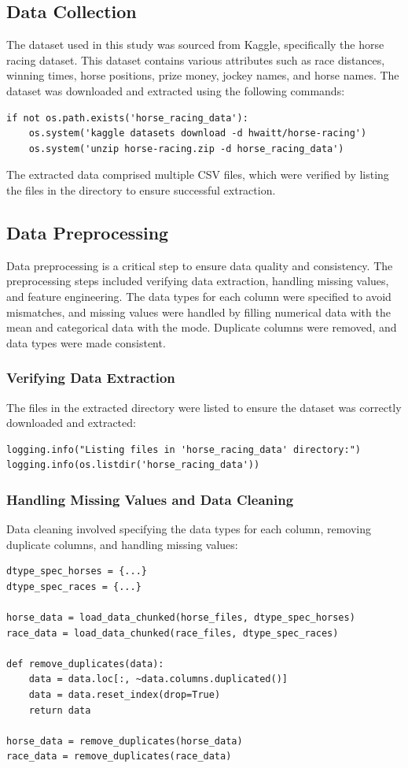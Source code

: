 \documentclass{article}
\begin{document}
\subsection*{Data Collection}
The dataset used in this study was sourced from Kaggle, specifically the horse racing dataset. This dataset contains various attributes such as race distances, winning times, horse positions, prize money, jockey names, and horse names. The dataset was downloaded and extracted using the following commands:
\begin{verbatim}
if not os.path.exists('horse_racing_data'):
    os.system('kaggle datasets download -d hwaitt/horse-racing')
    os.system('unzip horse-racing.zip -d horse_racing_data')
\end{verbatim}
The extracted data comprised multiple CSV files, which were verified by listing the files in the directory to ensure successful extraction.

\subsection*{Data Preprocessing}
Data preprocessing is a critical step to ensure data quality and consistency. The preprocessing steps included verifying data extraction, handling missing values, and feature engineering. The data types for each column were specified to avoid mismatches, and missing values were handled by filling numerical data with the mean and categorical data with the mode. Duplicate columns were removed, and data types were made consistent.

\subsubsection*{Verifying Data Extraction}
The files in the extracted directory were listed to ensure the dataset was correctly downloaded and extracted:
\begin{verbatim}
logging.info("Listing files in 'horse_racing_data' directory:")
logging.info(os.listdir('horse_racing_data'))
\end{verbatim}

\subsubsection*{Handling Missing Values and Data Cleaning}
Data cleaning involved specifying the data types for each column, removing duplicate columns, and handling missing values:
\begin{verbatim}
dtype_spec_horses = {...}
dtype_spec_races = {...}

horse_data = load_data_chunked(horse_files, dtype_spec_horses)
race_data = load_data_chunked(race_files, dtype_spec_races)

def remove_duplicates(data):
    data = data.loc[:, ~data.columns.duplicated()]
    data = data.reset_index(drop=True)
    return data

horse_data = remove_duplicates(horse_data)
race_data = remove_duplicates(race_data)
\end{verbatim}
\end{document}
